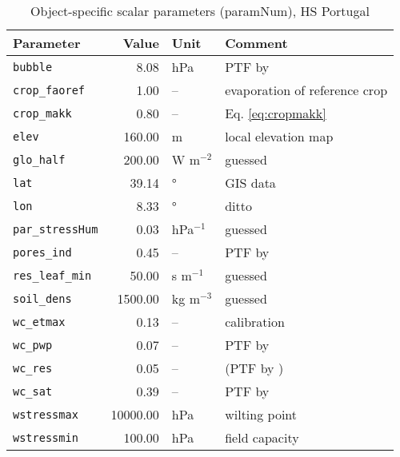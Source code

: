 \begin{table}[ht]
\centering
\caption{Object-specific scalar parameters (\textsf{paramNum}), HS Portugal} 
\label{tab:portugalHS_paramNum}
\begin{tabular}{lrll}
  \hline
Parameter & Value & Unit & Comment \\ 
  \hline
\verb!bubble! & 8.08 & hPa & PTF by \citet{rawls85} \\ 
  \verb!crop_faoref! & 1.00 & -- & evaporation of reference crop \\ 
  \verb!crop_makk! & 0.80 & -- & Eq. \ref{eq:cropmakk} \\ 
  \verb!elev! & 160.00 & m & local elevation map \\ 
  \verb!glo_half! & 200.00 & W m$^{-2}$ & guessed \\ 
  \verb!lat! & 39.14 & ° & GIS data \\ 
  \verb!lon! & 8.33 & ° & ditto \\ 
  \verb!par_stressHum! & 0.03 & hPa$^{-1}$ & guessed \\ 
  \verb!pores_ind! & 0.45 & -- & PTF by \citet{rawls85} \\ 
  \verb!res_leaf_min! & 50.00 & s m$^{-1}$ & guessed \\ 
  \verb!soil_dens! & 1500.00 & kg m$^{-3}$ & guessed \\ 
  \verb!wc_etmax! & 0.13 & -- & calibration \\ 
  \verb!wc_pwp! & 0.07 & -- & PTF by \citet{rawls85} \\ 
  \verb!wc_res! & 0.05 & -- & (PTF by \citet{rawls85}) \\ 
  \verb!wc_sat! & 0.39 & -- & PTF by \citet{woesten99} \\ 
  \verb!wstressmax! & 10000.00 & hPa & wilting point \\ 
  \verb!wstressmin! & 100.00 & hPa & field capacity \\ 
   \hline
\end{tabular}
\end{table}
